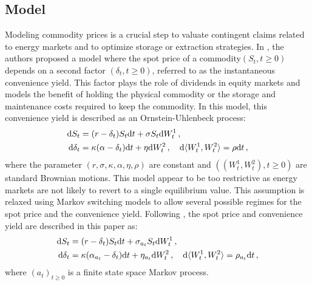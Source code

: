 \subsection{Model}
Modeling commodity prices is a crucial step to valuate contingent claims related to energy markets and to optimize storage or extraction strategies. In \cite{gibson:schwartz:1990,schwartz:1997}, the authors proposed a model where the spot price of a commodity$(S_t, t \geq 0)$ depends on a second factor $(\delta_t, t \geq 0)$, referred to as the instantaneous convenience yield. This factor plays the role of dividends in equity markets and models the benefit of holding the physical commodity or the storage and maintenance costs required to keep the commodity. In this model, this convenience yield is described as an Ornstein-Uhlenbeck process:
\begin{align*}
\mathrm{d} S_{t} & = (r-\delta_{t})S_{t}\mathrm{d} t+\sigma S_{t} \mathrm{d} W_{t}^{1} \,,\\
\mathrm{d} \delta_{t} & = \kappa(\alpha-\delta_{t})\mathrm{d} t+\eta \mathrm{d} W_{t}^{2} \,, \quad \mathrm{d} \langle W_t^1, W_t^2\rangle = \rho \mathrm{d} t\,,
\end{align*}
where the parameter $\left(r, \sigma, \kappa, \alpha, \eta, \rho \right)$ are constant and $( (W_t^1,W_t^2), t \geq 0)$ are standard Brownian motions. This model appear to be too restrictive as energy markets are not likely to revert to a single equilibrium value. This assumption is relaxed using Markov switching models to allow several possible regimes for the spot price and the convenience yield. Following \cite{almansour:2016}, the spot price and convenience yield are described in this paper as:
\begin{align*}
\mathrm{d} S_{t} & = (r-\delta_{t})S_{t}\mathrm{d} t+\sigma_{a_t} S_{t}\mathrm{d} W_{t}^{1} \,,\\
\mathrm{d}\delta_{t} & = \kappa (\alpha_{a_t} -\delta_{t})\mathrm{d} t+\eta_{a_t} \mathrm{d} W_{t}^{2} \,, \quad \mathrm{d}\langle W_t^1, W_t^2\rangle = \rho_{a_t} \mathrm{d} t\,,
\end{align*}
where $(a_t)_{t\ge 0}$ is a finite state space Markov process.

